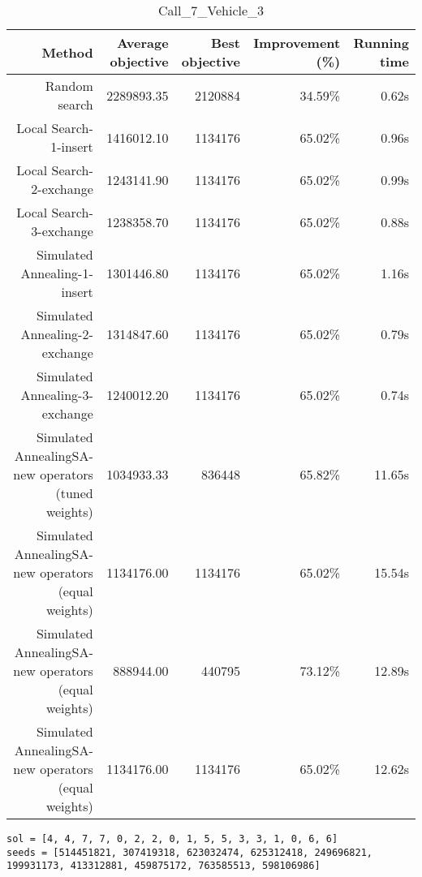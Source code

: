 \begin{table}[ht]
\centering
\caption{Call\_7\_Vehicle\_3}
\label{tab:call7vehicle3}
\begin{tabular}{|r|r|r|r|r|}
Method & Average objective & Best objective & Improvement (\%) & Running time \\
\hline
Random search & 2289893.35 & 2120884 & 34.59\% & 0.62s\\
Local Search-1-insert & 1416012.10 & 1134176 & 65.02\% & 0.96s\\
Local Search-2-exchange & 1243141.90 & 1134176 & 65.02\% & 0.99s\\
Local Search-3-exchange & 1238358.70 & 1134176 & 65.02\% & 0.88s\\
Simulated Annealing-1-insert & 1301446.80 & 1134176 & 65.02\% & 1.16s\\
Simulated Annealing-2-exchange & 1314847.60 & 1134176 & 65.02\% & 0.79s\\
Simulated Annealing-3-exchange & 1240012.20 & 1134176 & 65.02\% & 0.74s\\
Simulated AnnealingSA-new operators (tuned weights) & 1034933.33 & 836448 & 65.82\% & 11.65s\\
Simulated AnnealingSA-new operators (equal weights) & 1134176.00 & 1134176 & 65.02\% & 15.54s\\
Simulated AnnealingSA-new operators (equal weights) & 888944.00 & 440795 & 73.12\% & 12.89s\\
Simulated AnnealingSA-new operators (equal weights) & 1134176.00 & 1134176 & 65.02\% & 12.62s\\
\end{tabular}%
\end{table}
\begin{lstlisting}[label={lst:call7vehicle3},caption=Optimal solution call\_7\_vehicle\_3]
sol = [4, 4, 7, 7, 0, 2, 2, 0, 1, 5, 5, 3, 3, 1, 0, 6, 6]
seeds = [514451821, 307419318, 623032474, 625312418, 249696821, 199931173, 413312881, 459875172, 763585513, 598106986]
\end{lstlisting}%
\clearpage


